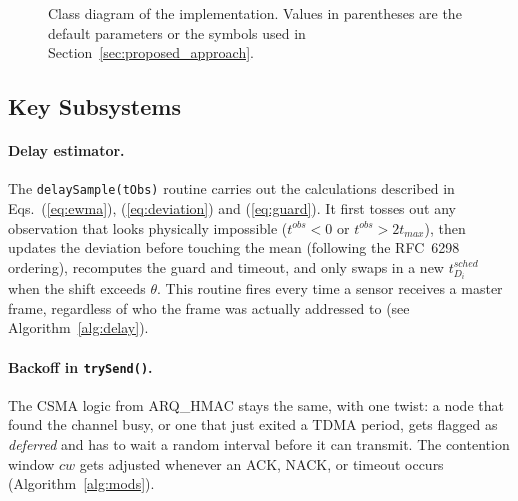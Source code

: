 \documentclass{article}
\begin{document}
\begin{figure}[H]
\caption{Class diagram of the implementation. Values in parentheses are the default parameters or the symbols used in Section~\ref{sec:proposed_approach}.}
\label{fig:classdiagram}
\end{figure}

\subsection{Key Subsystems}

\paragraph{Delay estimator.} The \texttt{delaySample(tObs)} routine carries out the calculations described in Eqs.~(\ref{eq:ewma}), (\ref{eq:deviation}) and (\ref{eq:guard}). It first tosses out any observation that looks physically impossible ($t^{obs} < 0$ or $t^{obs} > 2t_{max}$), then updates the deviation before touching the mean (following the RFC~6298 ordering), recomputes the guard and timeout, and only swaps in a new $t^{sched}_{D_i}$ when the shift exceeds $\theta$. This routine fires every time a sensor receives a master frame, regardless of who the frame was actually addressed to (see Algorithm~\ref{alg:delay}).

\paragraph{Backoff in \texttt{trySend()}.} The CSMA logic from ARQ\_HMAC stays the same, with one twist: a node that found the channel busy, or one that just exited a TDMA period, gets flagged as \emph{deferred} and has to wait a random interval before it can transmit. The contention window $cw$ gets adjusted whenever an ACK, NACK, or timeout occurs (Algorithm~\ref{alg:mods}).
\end{document}
